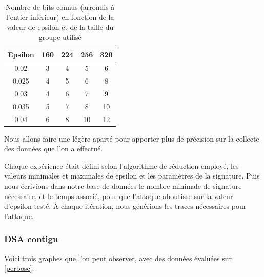 \documentclass{backend}
\begin{document}
\begin{table}[H]
    \centering
    \caption{Nombre de bits connus (arrondis à l'entier inférieur) en fonction de la valeur de epsilon et de la taille du groupe utilisé}
    \begin{tabular}{|c|c|c|c|c|}
        \toprule
        Epsilon & 160 & 224 & 256 & 320\\
        \midrule
        0.02 & 3 & 4 & 5 & 6 \\
        0.025 & 4 & 5 & 6 & 8 \\
        0.03 & 4 & 6 & 7 & 9 \\
        0.035 & 5 & 7 & 8 & 10 \\
        0.04 & 6 & 8 & 10 & 12 \\
        \bottomrule
    \end{tabular}
    \label{tab:epsilon_bits}
\end{table}

Nous allons faire une légère aparté pour apporter plus de précision sur la collecte des données que l'on a effectué.\medbreak

Chaque expérience était défini selon l'algorithme de réduction employé, les valeurs minimales et maximales de epsilon et les paramètres de la signature. Puis nous écrivions dans notre base de données le nombre minimale de signature nécessaire, et le temps associé, pour que l'attaque aboutisse sur la valeur d'epsilon testé. À chaque itération, nous générions les traces nécessaires pour l'attaque.

\newpage
\subsubsection{DSA contigu}

Voici trois graphes que l'on peut observer, avec des données évaluées sur \ref{perbosc}.
\end{document}
